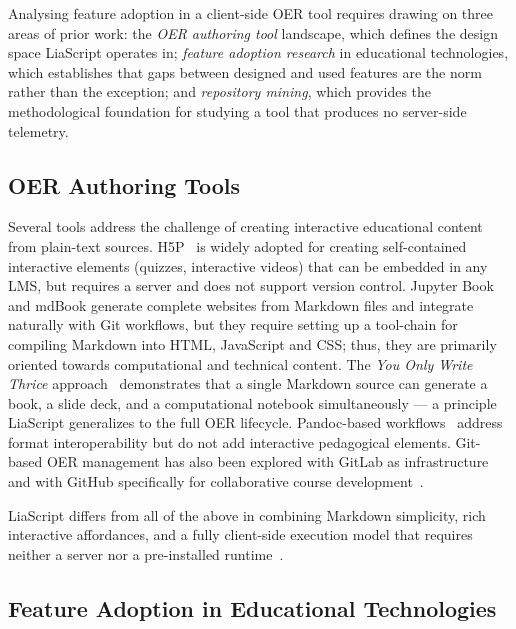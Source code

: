 
Analysing feature adoption in a client-side OER tool requires drawing on
three areas of prior work:
the \emph{OER authoring tool} landscape, which defines the design space
LiaScript operates in;
\emph{feature adoption research} in educational technologies, which
establishes that gaps between designed and used features are the norm
rather than the exception;
and \emph{repository mining}, which provides the methodological foundation
for studying a tool that produces no server-side telemetry.

\subsection{OER Authoring Tools}
\label{sec:rw:tools}

Several tools address the challenge of creating interactive educational content
from plain-text sources.
H5P~\cite{Kiryakova2022,Fornasari2025} is widely adopted for creating
self-contained interactive elements (quizzes, interactive videos) that can be
embedded in any LMS, but requires a server and does not support version control.
Jupyter Book~\cite{JupyterBook2025,Betlem2025} and mdBook generate complete
websites from Markdown files and integrate naturally with Git workflows, but they require setting up a tool-chain for compiling Markdown into HTML, JavaScript and CSS; thus, they are primarily oriented towards computational and technical content.
The \emph{You Only Write Thrice} approach~\cite{WriteThrice2021} demonstrates
that a single Markdown source can generate a book, a slide deck, and a
computational notebook simultaneously --- a principle LiaScript generalizes
to the full OER lifecycle.
Pandoc-based workflows~\cite{Krewinkel2017} address format interoperability
but do not add interactive pedagogical elements.
Git-based OER management has also been explored with GitLab as
infrastructure~\cite{Moser2025} and with GitHub specifically for
collaborative course development~\cite{Schroeder2020}.

LiaScript differs from all of the above in combining Markdown simplicity,
rich interactive affordances, and a fully client-side execution model
that requires neither a server nor a pre-installed runtime~\cite{Baur2025}.

\subsection{Feature Adoption in Educational Technologies}
\label{sec:rw:adoption}

